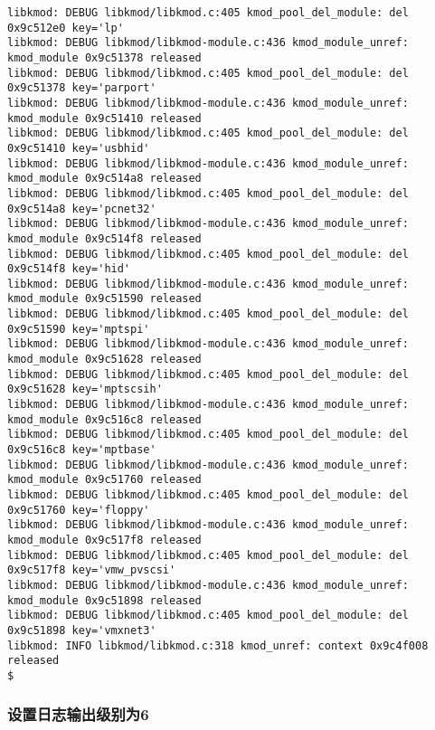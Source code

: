 \documentclass[11pt,a4paper]{article}
\begin{document}
{\begin{shaded}
\begin{verbatim}
libkmod: DEBUG libkmod/libkmod.c:405 kmod_pool_del_module: del 0x9c512e0 key='lp'
libkmod: DEBUG libkmod/libkmod-module.c:436 kmod_module_unref: kmod_module 0x9c51378 released
libkmod: DEBUG libkmod/libkmod.c:405 kmod_pool_del_module: del 0x9c51378 key='parport'
libkmod: DEBUG libkmod/libkmod-module.c:436 kmod_module_unref: kmod_module 0x9c51410 released
libkmod: DEBUG libkmod/libkmod.c:405 kmod_pool_del_module: del 0x9c51410 key='usbhid'
libkmod: DEBUG libkmod/libkmod-module.c:436 kmod_module_unref: kmod_module 0x9c514a8 released
libkmod: DEBUG libkmod/libkmod.c:405 kmod_pool_del_module: del 0x9c514a8 key='pcnet32'
libkmod: DEBUG libkmod/libkmod-module.c:436 kmod_module_unref: kmod_module 0x9c514f8 released
libkmod: DEBUG libkmod/libkmod.c:405 kmod_pool_del_module: del 0x9c514f8 key='hid'
libkmod: DEBUG libkmod/libkmod-module.c:436 kmod_module_unref: kmod_module 0x9c51590 released
libkmod: DEBUG libkmod/libkmod.c:405 kmod_pool_del_module: del 0x9c51590 key='mptspi'
libkmod: DEBUG libkmod/libkmod-module.c:436 kmod_module_unref: kmod_module 0x9c51628 released
libkmod: DEBUG libkmod/libkmod.c:405 kmod_pool_del_module: del 0x9c51628 key='mptscsih'
libkmod: DEBUG libkmod/libkmod-module.c:436 kmod_module_unref: kmod_module 0x9c516c8 released
libkmod: DEBUG libkmod/libkmod.c:405 kmod_pool_del_module: del 0x9c516c8 key='mptbase'
libkmod: DEBUG libkmod/libkmod-module.c:436 kmod_module_unref: kmod_module 0x9c51760 released
libkmod: DEBUG libkmod/libkmod.c:405 kmod_pool_del_module: del 0x9c51760 key='floppy'
libkmod: DEBUG libkmod/libkmod-module.c:436 kmod_module_unref: kmod_module 0x9c517f8 released
libkmod: DEBUG libkmod/libkmod.c:405 kmod_pool_del_module: del 0x9c517f8 key='vmw_pvscsi'
libkmod: DEBUG libkmod/libkmod-module.c:436 kmod_module_unref: kmod_module 0x9c51898 released
libkmod: DEBUG libkmod/libkmod.c:405 kmod_pool_del_module: del 0x9c51898 key='vmxnet3'
libkmod: INFO libkmod/libkmod.c:318 kmod_unref: context 0x9c4f008 released
$ 
\end{verbatim}\end{shaded}}
\subsubsection{设置日志输出级别为6}
\end{document}
